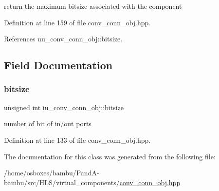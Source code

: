 return the maximum bitsize associated with the component 



Definition at line 159 of file conv\+\_\+conn\+\_\+obj.\+hpp.



References uu\+\_\+conv\+\_\+conn\+\_\+obj\+::bitsize.



\subsection{Field Documentation}
\mbox{\label{classiu__conv__conn__obj_a973b7dc9eda0ede85d11f2ac18315aea}} 
\subsubsection{\texorpdfstring{bitsize}{bitsize}}
{\footnotesize\ttfamily unsigned int iu\+\_\+conv\+\_\+conn\+\_\+obj\+::bitsize\hspace{0.3cm}{\ttfamily [private]}}



number of bit of in/out ports 



Definition at line 133 of file conv\+\_\+conn\+\_\+obj.\+hpp.



The documentation for this class was generated from the following file\+:\begin{DoxyCompactItemize}
\item 
/home/osboxes/bambu/\+Pand\+A-\/bambu/src/\+H\+L\+S/virtual\+\_\+components/\hyperlink{conv__conn__obj_8hpp}{conv\+\_\+conn\+\_\+obj.\+hpp}\end{DoxyCompactItemize}
